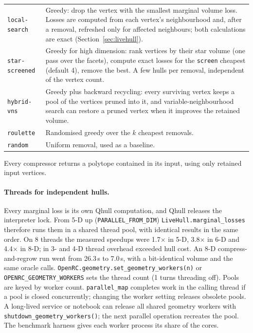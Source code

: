 \documentclass[11pt,a4paper]{report}
\newcommand{\code}[1]{\texttt{\small #1}}
\begin{document}
\begin{center}\small
\begin{tabular}{@{}lp{9.7cm}@{}}
\toprule
\code{local-search} & Greedy: drop the vertex with the smallest marginal volume
  loss. Losses are computed from each vertex's neighbourhood and, after a
  removal, refreshed only for affected neighbours; both calculations are exact
  (Section~\ref{sec:livehull}). \\
\code{star-screened} & Greedy for high dimension: rank vertices by their star
  volume (one pass over the facets), compute exact losses for the
  \code{screen} cheapest (default 4), remove the best. A few hulls per removal,
  independent of the vertex count. \\
\code{hybrid-vns} & Greedy plus backward recycling: every surviving vertex keeps
  a pool of the vertices pruned into it, and variable-neighbourhood search can
  restore a pruned vertex when it improves the retained volume. \\
\code{roulette}   & Randomised greedy over the $k$ cheapest removals. \\
\code{random}     & Uniform removal, used as a baseline. \\
\bottomrule
\end{tabular}
\end{center}

Every compressor returns a polytope contained in its input, using only retained
input vertices.

\paragraph{Threads for independent hulls.} Every marginal loss is its own
Qhull computation, and Qhull releases the interpreter lock. From 5-D up
(\code{PARALLEL\_FROM\_DIM}) \code{LiveHull.marginal\_losses} therefore runs
them in a shared thread pool, with identical results in the same order. On 8
threads the measured speedups were 1.7$\times$ in 5-D, 3.8$\times$ in 6-D and
4.4$\times$ in 8-D; in 3- and 4-D thread overhead exceeded hull cost. An 8-D
compress-and-regrow run went from 26.3\,s to 7.0\,s, with a bit-identical
volume and the same oracle calls. \code{OpenRC.geometry.set\_geometry\_workers(n)}
or \code{OPENRC\_GEOMETRY\_WORKERS} sets the thread count (1 turns threading
off). Pools are keyed by worker count. \code{parallel\_map} completes work in
the calling thread if a pool is closed concurrently; changing the worker
setting releases obsolete pools. A long-lived service or notebook can release
all shared geometry workers with
\code{shutdown\_geometry\_workers()}; the next parallel operation recreates the
pool. The benchmark harness gives each worker process its share of the cores.
\end{document}
